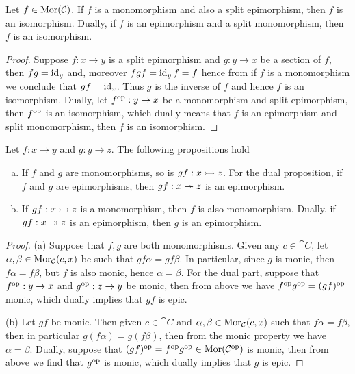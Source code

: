 \begin{proposition}
  Let \(f \in \operatorname{Mor}(\mathcal C)\). If \(f\) is a monomorphism and also a split
  epimorphism, then \(f\) is an isomorphism. Dually, if \(f\) is an epimorphism
  and a split monomorphism, then \(f\) is an isomorphism.
\end{proposition}

\begin{proof}
  Suppose \(f: x \to y\) is a split epimorphism and \(g: y \to x\) be a section
  of \(f\), then \(f g = \operatorname{id}_y\) and, moreover \(f g f = \operatorname{id}_y
  f = f\) hence from if \(f\) is a monomorphism we conclude that \(g
  f = \operatorname{id}_x\). Thus \(g\) is the inverse of \(f\) and hence \(f\) is an
  isomorphism. Dually, let \(f^{\mathrm{op}}: y \to x\) be a monomorphism and split
  epimorphism, then \(f^{\mathrm{op}}\) is an isomorphism, which dually means that \(f\)
  is an epimorphism and split monomorphism, then \(f\) is an isomorphism.
\end{proof}

\begin{lemma}
  Let \(f: x \to y\) and \(g: y \to z\). The following propositions hold
  \begin{enumerate}[(a).]
    \item If \(f\) and \(g\) are monomorphisms, so is \(g f: x \rightarrowtail z\).
      For the dual proposition, if \(f\) and \(g\) are epimorphisms, then \(g
      f: x \twoheadrightarrow z\) is an epimorphism.
    \item If \(g f: x \rightarrowtail z\) is a monomorphism, then \(f\) is also
      monomorphism.  Dually, if \(g f: x \twoheadrightarrow z\) is an epimorphism, then
      \(g\) is an epimorphism.
  \end{enumerate}
\end{lemma}

\begin{proof}
  (a) Suppose that \(f, g\) are both monomorphisms. Given any \(c \in \cat C\),
  let \(\alpha, \beta \in \operatorname{Mor}_{\mathcal C}(c, x)\) be such that \(g f \alpha = g f
  \beta\). In particular, since \(g\) is monic, then \(f \alpha = f \beta\), but
  \(f\) is also monic, hence \(\alpha = \beta\). For the dual part, suppose that
  \(f^{\mathrm{op}}: y \to x\) and \(g^{\mathrm{op}}: z \to y\) be monic, then from above we have
  \(f^{\mathrm{op}} g^{\mathrm{op}} = (g f)^{\mathrm{op}}\) monic, which dually implies that \(g f\) is epic.

  (b) Let \(g f\) be monic. Then given \(c \in \cat C\) and \(\alpha, \beta \in
  \operatorname{Mor}_{\mathcal C}(c, x)\) such that \(f \alpha = f \beta\), then in particular
  \(g(f \alpha) = g(f \beta)\), then from the monic property we have \(\alpha =
  \beta\). Dually, suppose that \((g f)^{\mathrm{op}} = f^{\mathrm{op}} g^{\mathrm{op}} \in \operatorname{Mor}(\mathcal C^{\mathrm{op}})\)
  is monic, then from above we find that \(g^{\mathrm{op}}\) is monic, which dually
  implies that \(g\) is epic.
\end{proof}
